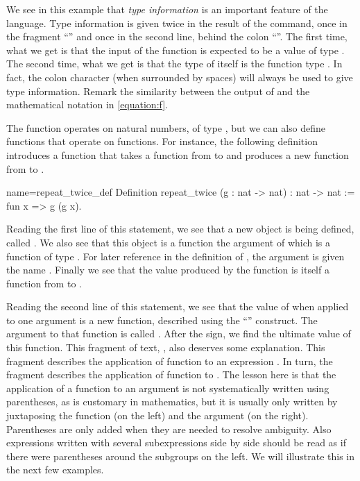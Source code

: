We see in this example that {\em type information} is an important
feature of the language.  Type information is given twice in the
result of the  command, once in the fragment ``'' and once in the second line, behind the colon ``\C{:}''.  The first
time, what we get is that the input of the function is expected to be
a value of type .  The second time, what we get is that the
type of  itself is the function type .  In fact,
the colon character (when surrounded by spaces) will always be used to
give type information.  Remark the similarity between the output of 
and the mathematical notation in \eqref{equation:f}.

The function  operates on natural numbers, of type , but
we can also define functions that operate on functions.  For instance,
the following definition introduces a function that takes a function
from  to  and produces a new function from  to
.

\begin{coq}{name=repeat_twice_def}{}
Definition repeat_twice (g : nat -> nat) : nat -> nat :=
  fun x => g (g x).
\end{coq}
Reading the first line of this statement, we see that a new object is
being defined, called .  We also see that this object
is a function the argument of which is a function of
type .  For later reference in the definition of
, the argument is given the name .  Finally
we see that the value produced by the function 
is itself a function from  to .

Reading the second line of this statement, we see that the value
of  when applied to one argument is a new
function, described using the ``'' construct.  The
argument to that function is called .  After the \C{=>} sign, we
find the ultimate value of this function.  This fragment of text, , also deserves some explanation.  This fragment describes the
application of function  to an expression .  In turn,
the fragment  describes the application of function  to
.  The lesson here is that the application of a function to an
argument is not systematically written using parentheses, as is
customary in mathematics, but it is usually only written by
juxtaposing the function (on the left) and the argument (on the
right).  Parentheses are only added when they are needed to resolve
ambiguity.  Also expressions written with several subexpressions side
by side should be read as if there were parentheses around the
subgroups on the left.  We will illustrate this in the next few
examples.

